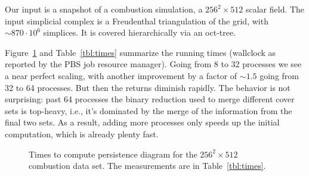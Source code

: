 Our input is a snapshot of a combustion simulation, a $256^2 \times 512$ scalar
field.
The input simplicial complex is a Freudenthal triangulation of the grid,
with $\sim 870 \cdot 10^6$ simplices. It is covered hierarchically via an
oct-tree.

Figure~\ref{fig:times} and Table~\ref{tbl:times} summarize the running times
(wallclock as reported by the PBS job resource manager).
Going from 8 to 32 processes we see a near
perfect scaling, with another improvement by a factor of $\sim 1.5$ going from
32 to 64 processes. But then the returns diminish rapidly. The behavior is not
surprising: past 64 processes the binary reduction used to merge
different cover sets is top-heavy, i.e., it's dominated by the merge of the
information from the final two sets. As a result, adding more processes only
speeds up the initial computation, which is already plenty fast.

\pltCombustionMed

\begin{figure}
    \centering

    \caption{Times to compute persistence diagram for the $256^2 \times 512$
             combustion data set. The measurements are in Table~\ref{tbl:times}.}
    \label{fig:times}
\end{figure}

